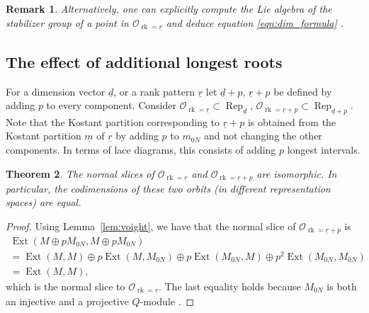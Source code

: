 \documentclass[a4paper]{amsart}
\DeclareMathOperator{\rk}{rk}
\DeclareMathOperator{\Ext}{Ext}
\DeclareMathOperator{\Rep}{\mathrm{Rep}}
\newcommand{\R}{\mathbb{R}}
\newcommand{\CO}{\mathcal{O}}
\newcommand{\CR}{\mathcal{R}}
\newcommand{\ur}{\underline{r}}
\newcommand{\um}{\underline{m}}
\newcommand{\ud}{\underline{d}}
\newcommand{\orb}{\mathrm{orb}}
\newtheorem{thm}{Theorem}[section]
\theoremstyle{plain}
\newtheorem{remark}[thm]{Remark}
\begin{document}
\begin{remark} \rm
Alternatively, one can explicitly compute the Lie algebra of the stabilizer group of a point in $\CO_{\rk=\ur}$ and deduce equation \eqref{eqn:dim_formula} \cite[Lemma 3.2]{abeasis-del_fra-kraft}.
\end{remark}




\subsection{The effect of additional longest roots} \label{sec:add_longest}

For a dimension vector $\ud$, or a rank pattern $\ur$ let $\ud+p$, $\ur+p$ be defined by adding $p$ to every component. Consider $\CO_{\rk=\ur} \subset \Rep_{\ud}$, $\CO_{\rk=\ur+p} \subset \Rep_{\ud+p}$. Note that the Kostant partition corresponding to $\ur+p$ is obtained from the Kostant partition $\um$ of $\ur$ by adding $p$ to $m_{0N}$ and not changing the other components. In terms of lace diagrams, this consists of adding $p$ longest intervals.

\begin{thm}
\label{thm:addlongest}
    The normal slices of $\CO_{\rk=\ur}$ and $\CO_{\rk=\ur+p}$ are isomorphic. In particular, the codimensions of these two orbits (in different representation spaces) are equal.
\end{thm}

\begin{proof}
Using Lemma~\ref{lem:voight}, we have that the normal slice of $\CO_{\rk=\ur+p}$ is 
    \begin{multline}
    \Ext(M\oplus pM_{0N},M\oplus pM_{0N})\\=
        \Ext(M,M) \oplus
        p\Ext(M,M_{0N}) \oplus
        p\Ext(M_{0N},M) \oplus
        p^2\Ext(M_{0N},M_{0N})
        \\=
       \Ext(M,M),
        \end{multline}
    which is the normal slice to $\CO_{\rk=\ur}$.
    The last equality holds because $M_{0N}$ is both an injective and a projective $Q$-module \cite{FRduke}.
\end{proof}
\end{document}
